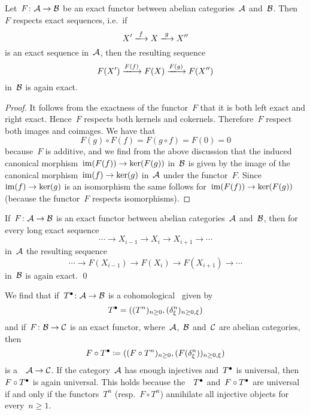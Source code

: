 \section{}





\begin{lemma}
  Let~$F \colon \mathcal{A} \to \mathcal{B}$ be an exact functor between abelian categories~$\mathcal{A}$ and~$\mathcal{B}$.
  Then~$F$ respects exact sequences, i.e.\ if
  \[
    X'
    \xlongto{f}
    X
    \xlongto{g}
    X''
  \]
  is an exact sequence in~$\mathcal{A}$, then the resulting sequence
  \[
    F(X')
    \xlongto{F(f)}
    F(X)
    \xlongto{F(g)}
    F(X'')
  \]
  in~$\mathcal{B}$ is again exact.
\end{lemma}


\begin{proof}
  It follows from the exactness of the functor~$F$ that it is both left exact and right exact.
  Hence~$F$ respects both kernels and cokernels.
  Therefore~$F$ respect both images and coimages.
  We have that
  \[
      F(g) \circ F(f)
    = F(g \circ f)
    = F(0)
    = 0
  \]
  because~$F$ is additive, and we find from the above discussion that the induced canonical morphism~$\operatorname{im}(F(f)) \to \ker(F(g))$ in~$\mathcal{B}$ is given by the image of the canonical morphism~$\operatorname{im}(f) \to \ker(g)$ in~$\mathcal{A}$ under the functor~$F$.
  Since~$\operatorname{im}(f) \to \ker(g)$ is an isomorphism the same follows for~$\operatorname{im}(F(f)) \to \ker(F(g))$ (because the functor~$F$ respects isomorphisms).
\end{proof}


\begin{corollary}
  If~$F \colon \mathcal{A} \to \mathcal{B}$ is an exact functor between abelian categories~$\mathcal{A}$ and~$\mathcal{B}$, then for every long exact sequence
  \[
    \dotsb
    \to
    X_{i-1}
    \to
    X_i
    \to
    X_{i+1}
    \to
    \dotsb
  \]
  in~$\mathcal{A}$ the resulting sequence
  \[
    \dotsb
    \to
    F(X_{i-1})
    \to
    F(X_i)
    \to
    F(X_{i+1})
    \to
    \dotsb
  \]
  in~$\mathcal{B}$ is again exact.
  \qed
\end{corollary}

We find that if~$T^\bullet \colon \mathcal{A} \to \mathcal{B}$ is a cohomological~{\deltafun} given by
\[
  T^\bullet
  =
  ( (T^n)_{n \geq 0}, (\delta^n_\xi)_{n \geq 0, \xi} )
\]
and if~$F \colon \mathcal{B} \to \mathcal{C}$ is an exact functor, where~$\mathcal{A}$,~$\mathcal{B}$ and~$\mathcal{C}$ are abelian categories, then
\[
  F \circ T^\bullet
  \coloneqq
  ( (F \circ T^n)_{n \geq 0}, (F(\delta^n_\xi))_{n \geq 0, \xi} )
\]
is a~{\deltafun}~$\mathcal{A} \to \mathcal{C}$.
If the category~$\mathcal{A}$ has enough injectives and~$T^\bullet$ is universal, then~$F \circ T^\bullet$ is again universal.
This holds because the~{\deltafuns}~$T^\bullet$ and~$F \circ T^\bullet$ are universal if and only if the functors~$T^n$ (resp.~$F \circ T^n$) annihilate all injective objects for every~$n \geq 1$.

